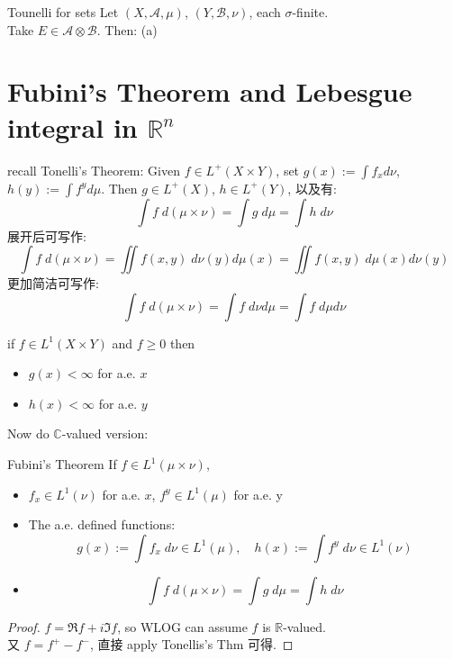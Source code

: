 \documentclass[lang=cn,11pt]{elegantbook}
\begin{document}
\begin{theorem}{Tounelli for sets}
 Let $(X,\mathcal{A}, \mu)$, $(Y, \mathcal{B}, \nu)$, each $\sigma$-finite.\\
Take $E \in \mathcal{A} \otimes \mathcal{B}$. Then: 
(a) 
\end{theorem}
















\chapter{Fubini's Theorem and Lebesgue integral in $\mathbb{R}^n$}
recall Tonelli's Theorem: Given $f \in L^+(X \times Y)$, set $g(x) := \int f_x d\nu $, $h(y) := \int f^y d \mu$. 
Then $g \in L^+(X)$, $h \in L^+(Y)$, 以及有: \[
\int f \; d(\mu \times \nu) = \int g \; d \mu = \int h \; d\nu
\]
展开后可写作: \[
\int f \; d(\mu \times \nu)  = \iint  f(x,y) \; d\nu(y) d\mu(x) = \iint f(x,y) \; d\mu(x) d\nu(y)
\]更加简洁可写作: \[
\int f \; d(\mu \times \nu) = \int f \; d\nu d\mu  = \int f \; d\mu d\nu
\]

\begin{corollary}
    if $f \in L^1(X\times Y)$ and $f \geq 0$ then 
    \begin{itemize}
        \item     $g(x) < \infty$ for a.e. $x$
        \item $h(x) < \infty$ for a.e. $y$
    \end{itemize}
\end{corollary}


Now do $\mathbb{C}$-valued version:





\begin{theorem}{Fubini's Theorem}
    If $f \in L^1(\mu \times \nu)$, 
    \begin{itemize}
        \item $f_x \in L^1(\nu)$ for a.e. $x$, $f^y \in L^1(\mu)$ for a.e. y
        \item The a.e. defined functions: \[ g(x) := \int f_x \;d\nu \in L^1(\mu),\quad h(x) := \int f^y \;d\nu \in L^1(\nu) \]
        \item \[ \int f \; d(\mu \times \nu)  = \int g \; d\mu = \int h \; d\nu \]
    \end{itemize}
\end{theorem}
\begin{proof}
\(f = \Re f + i \Im f \), so WLOG can assume $f$ is $\mathbb{R}$-valued.\\
又 $f = f^+ - f^-$, 直接 apply Tonellis's Thm 可得.
\end{proof}
\end{document}
